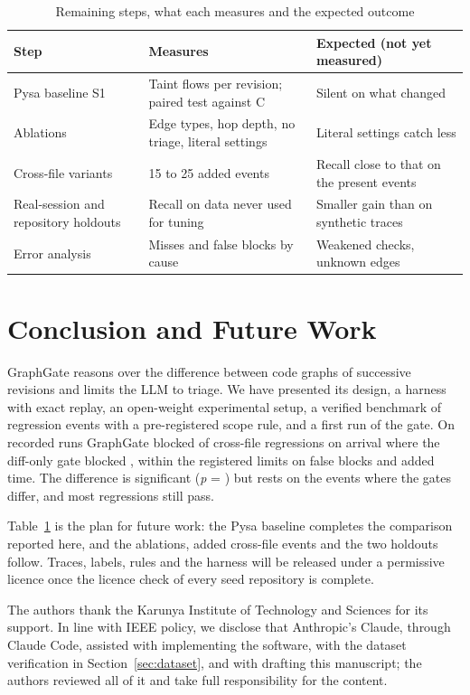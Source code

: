 \documentclass[conference]{IEEEtran}
\begin{document}
\begin{table}[t]
\caption{Remaining steps, what each measures and the expected outcome}
\label{tab:plan}
\centering
\footnotesize
\begin{tabular}{|p{1.9cm}|p{2.4cm}|p{2.8cm}|}
\hline
\textbf{Step} & \textbf{Measures} & \textbf{Expected (not yet measured)} \\
\hline
Pysa baseline S1 & Taint flows per revision; paired test against C & Silent on what changed \\
\hline
Ablations & Edge types, hop depth, no triage, literal settings & Literal settings catch less \\
\hline
Cross-file variants & 15 to 25 added events & Recall close to that on the present events \\
\hline
Real-session and repository holdouts & Recall on data never used for tuning & Smaller gain than on synthetic traces \\
\hline
Error analysis & Misses and false blocks by cause & Weakened checks, unknown edges \\
\hline
\end{tabular}
\end{table}

\section{Conclusion and Future Work}
\label{sec:conclusion}

GraphGate reasons over the difference between code graphs of successive revisions and limits the LLM to triage. We have presented its design, a harness with exact replay, an open-weight experimental setup, a verified benchmark of \nEventsSignedOff{} regression events with a pre-registered scope rule, and a first run of the gate. On \nRunReps{} recorded runs GraphGate blocked \nCCross{} of \nIntroCross{} cross-file regressions on arrival where the diff-only gate blocked \nBCross{}, within the registered limits on false blocks and added time. The difference is significant (\emph{p} = \nSigP{}) but rests on the \nSigDiffer{} events where the gates differ, and most regressions still pass.

Table~\ref{tab:plan} is the plan for future work: the Pysa baseline completes the comparison reported here, and the ablations, added cross-file events and the two holdouts follow. Traces, labels, rules and the harness will be released under a permissive licence once the licence check of every seed repository is complete.

The authors thank the Karunya Institute of Technology and Sciences for its support. In line with IEEE policy, we disclose that Anthropic's Claude, through Claude Code, assisted with implementing the software, with the dataset verification in Section~\ref{sec:dataset}, and with drafting this manuscript; the authors reviewed all of it and take full responsibility for the content.



\end{document}
